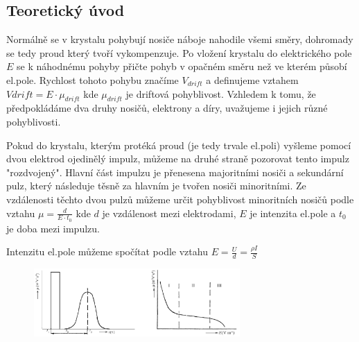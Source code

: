 \documentclass{article}
\begin{document}
\subsection*{Teoretický úvod}
Normálně se v krystalu pohybují nosiče náboje nahodile všemi směry, dohromady se tedy proud který tvoří vykompenzuje.
Po vložení krystalu do elektrického pole \(E\) se k náhodnému pohyby přičte pohyb v opačném směru než ve kterém působí el.pole.
Rychlost tohoto pohybu značíme \(V_{drift}\) a definujeme vztahem \(V{drift} = E\cdot \mu_{drift}\) kde \(\mu_{drift}\) je driftová pohyblivost.
Vzhledem k tomu, že předpokládáme dva druhy nosičů, elektrony a díry, uvažujeme i jejich různé pohyblivosti.

Pokud do krystalu, kterým protéká proud (je tedy trvale el.poli) vyšleme pomocí dvou elektrod ojedinělý impulz, můžeme na druhé straně pozorovat tento impulz "rozdvojený".
Hlavní část impulzu je přenesena majoritními nosiči a sekundární pulz, který následuje těsně za hlavním je tvořen nosiči minoritními.
Ze vzdálenosti těchto dvou pulzů můžeme určit pohyblivost minoritních nosičů podle vztahu \(\mu = \frac{d}{E\cdot t_0}\) kde \(d\) je vzdálenost mezi elektrodami, \(E\) je intenzita el.pole a \(t_0\) je doba mezi impulzu.

Intenzitu el.pole můžeme spočítat podle vztahu \(E = \frac{U}{d} = \frac{\rho I}{S}\)

\begin{figure}[H]
    \centering
    \includegraphics[width=0.7\textwidth]{pulzi_a_pad.png}
\end{figure}
\end{document}

